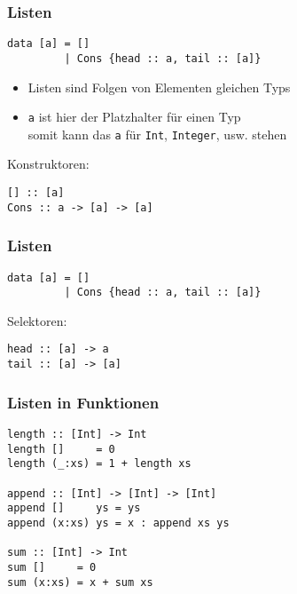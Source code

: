 \documentclass[fleqn,11pt,aspectratio=43]{beamer}
\begin{document}
\begin{frame}[fragile]
\frametitle{Listen}
\begin{lstlisting}
data [a] = []
         | Cons {head :: a, tail :: [a]}
\end{lstlisting}
\begin{block}{\vspace*{-3ex}}
\begin{itemize}
  \item Listen sind Folgen von Elementen gleichen Typs
  \item \lstinline|a| ist hier der Platzhalter für einen Typ\\
  		somit kann das \lstinline|a| für \lstinline|Int|, \lstinline|Integer|, usw. stehen
\end{itemize}
\end{block}  		
Konstruktoren: 
\pause
\begin{lstlisting}
[] :: [a]
Cons :: a -> [a] -> [a]
\end{lstlisting}
\end{frame}

\begin{frame}[fragile]
\frametitle{Listen}
\begin{lstlisting}
data [a] = []
         | Cons {head :: a, tail :: [a]}
\end{lstlisting}
Selektoren: 
\pause
\begin{lstlisting}
head :: [a] -> a
tail :: [a] -> [a]
\end{lstlisting}
\end{frame}

\begin{frame}[fragile]
\frametitle{Listen in Funktionen}
\begin{lstlisting}
length :: [Int] -> Int
length []     = 0
length (_:xs) = 1 + length xs

append :: [Int] -> [Int] -> [Int]
append []     ys = ys
append (x:xs) ys = x : append xs ys

sum :: [Int] -> Int
sum []     = 0
sum (x:xs) = x + sum xs
\end{lstlisting}
\end{frame}
\end{document}
